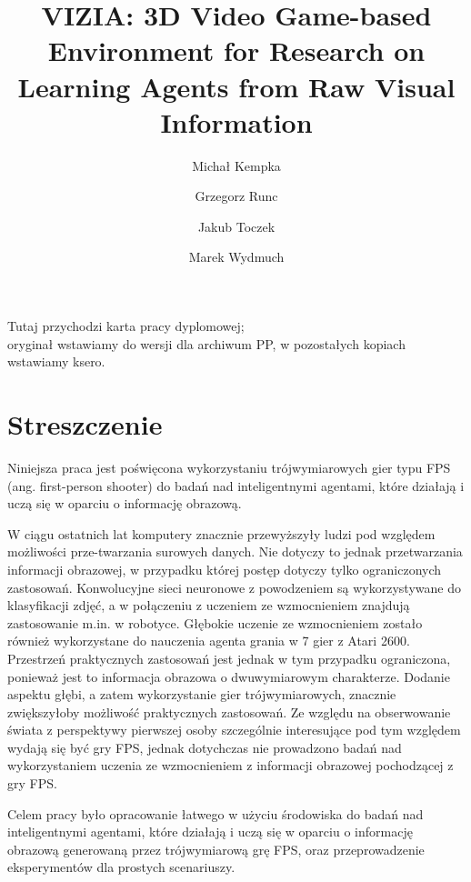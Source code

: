 \documentclass[english,bachelor,a4paper,twoside]{ppfcmthesis}
\author{%
   Michał Kempka \album{105256} \and 
   Grzegorz Runc \album{109759} \and 
   Jakub Toczek \album{109704} \and 
   Marek Wydmuch \album{109746}}
\title{VIZIA: 3D Video Game-based Environment for Research on Learning Agents from Raw Visual Information}        %
\begin{document}
\frontmatter\pagestyle{empty}%
\maketitle\cleardoublepage%

\thispagestyle{empty}\vspace*{\fill}%
\begin{center}Tutaj przychodzi karta pracy dyplomowej;\\oryginał wstawiamy do wersji dla archiwum PP, w pozostałych kopiach wstawiamy ksero.\end{center}%
\vfill\cleardoublepage%

\chapter*{Streszczenie}

Niniejsza praca jest poświęcona wykorzystaniu trójwymiarowych gier typu FPS (ang. first-person shooter) do badań nad inteligentnymi agentami, które działają i uczą się w oparciu o informację obrazową.

W ciągu ostatnich lat komputery znacznie przewyższyły ludzi pod względem możliwości prze-twarzania surowych danych.
Nie dotyczy to jednak przetwarzania informacji obrazowej, w przypadku której postęp dotyczy tylko ograniczonych zastosowań.
Konwolucyjne sieci neuronowe z powodzeniem są wykorzystywane do klasyfikacji zdjęć, a w połączeniu z uczeniem ze wzmocnieniem znajdują zastosowanie m.in. w robotyce.
Głębokie uczenie ze wzmocnieniem zostało również wykorzystane do nauczenia agenta grania w 7 gier z Atari 2600.
Przestrzeń praktycznych zastosowań jest jednak w tym przypadku ograniczona, ponieważ jest to informacja obrazowa o dwuwymiarowym charakterze.
Dodanie aspektu głębi, a zatem wykorzystanie gier trójwymiarowych, znacznie zwiększyłoby możliwość praktycznych zastosowań.
Ze względu na obserwowanie świata z perspektywy pierwszej osoby szczególnie interesujące pod tym względem wydają się być gry FPS, jednak dotychczas nie prowadzono badań nad wykorzystaniem uczenia ze wzmocnieniem z informacji obrazowej pochodzącej z gry FPS.

Celem pracy było opracowanie łatwego w użyciu środowiska do badań nad inteligentnymi agentami, które działają i uczą się w oparciu o informację obrazową generowaną przez trójwymiarową grę FPS, oraz przeprowadzenie eksperymentów dla prostych scenariuszy.
\end{document}
